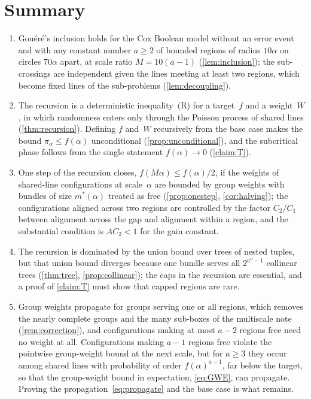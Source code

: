 \documentclass[11pt,letterpaper]{article}
\begin{document}
\section{Summary}
\label{sec:summary}

\begin{enumerate}
  \item Gou\'er\'e's inclusion holds for the Cox Boolean model without an error event and with any constant number $a\ge2$ of bounded regions of radius $10\alpha$ on circles $70\alpha$ apart, at scale ratio $M=10(a-1)$ (\cref{lem:inclusion}); the sub-crossings are independent given the lines meeting at least two regions, which become fixed lines of the sub-problems (\cref{lem:decoupling}).
  \item The recursion is a deterministic inequality~(R) for a target~$f$ and a weight~$W$, in which randomness enters only through the Poisson process of shared lines (\cref{thm:recursion}). Defining $f$ and~$W$ recursively from the base case makes the bound $\pi_\alpha\le f(\alpha)$ unconditional (\cref{prop:unconditional}), and the subcritical phase follows from the single statement $f(\alpha)\to0$ (\cref{claim:T}).
  \item One step of the recursion closes, $f(M\alpha)\le f(\alpha)/2$, if the weights of shared-line configurations at scale~$\alpha$ are bounded by group weights with bundles of size $m^*(\alpha)$ treated as free (\cref{prop:onestep}, \cref{cor:halving}); the configurations aligned across two regions are controlled by the factor $C_2/C_1$ between alignment across the gap and alignment within a region, and the substantial condition is $AC_2<1$ for the gain constant.
  \item The recursion is dominated by the union bound over trees of nested tuples, but that union bound diverges because one bundle serves all $2^{a^n-1}$ collinear trees (\cref{thm:tree}, \cref{prop:collinear}); the caps in the recursion are essential, and a proof of \cref{claim:T} must show that capped regions are rare.
  \item Group weights propagate for groups serving one or all regions, which removes the nearly complete groups and the many sub-boxes of the multiscale note (\cref{rem:correction}), and configurations making at most $a-2$ regions free need no weight at all. Configurations making $a-1$ regions free violate the pointwise group-weight bound at the next scale, but for $a\ge3$ they occur among shared lines with probability of order $f(\alpha)^{a-1}$, far below the target, so that the group-weight bound in expectation, \eqref{eq:GWE}, can propagate. Proving the propagation~\eqref{eq:propagate} and the base case is what remains.
\end{enumerate}
\end{document}
